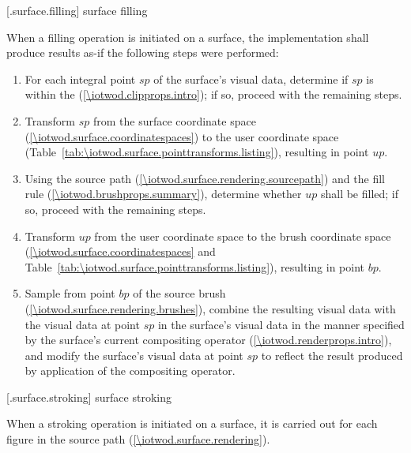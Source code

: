  [\iotwod.surface.filling] {surface filling}

\pnum
When a filling operation is initiated on a surface, the implementation shall produce results as-if the following steps were performed:

\begin{enumerate}
\item For each integral point $sp$ of the surface's visual data, determine if $sp$ is within the  (\ref{\iotwod.clipprops.intro}); if so, proceed with the remaining steps.
\item Transform $sp$ from the surface coordinate space (\ref{\iotwod.surface.coordinatespaces}) to the user coordinate space (Table~\ref{tab:\iotwod.surface.pointtransforms.listing}), resulting in point $up$.
\item Using the source path (\ref{\iotwod.surface.rendering.sourcepath}) and the fill rule (\ref{\iotwod.brushprops.summary}), determine whether $up$ shall be filled; if so, proceed with the remaining steps.
\item Transform $up$ from the user coordinate space to the brush coordinate space (\ref{\iotwod.surface.coordinatespaces} and Table~\ref{tab:\iotwod.surface.pointtransforms.listing}), resulting in point $bp$.
\item Sample from point $bp$ of the source brush (\ref{\iotwod.surface.rendering.brushes}), combine the resulting visual data with the visual data at point $sp$ in the surface's visual data in the manner specified by the surface's current compositing operator (\ref{\iotwod.renderprops.intro}), and modify the surface's visual data at point $sp$ to reflect the result produced by application of the compositing operator.
\end{enumerate}

 [\iotwod.surface.stroking] {surface stroking}

\pnum
When a stroking operation is initiated on a surface, it is carried out for each figure in the source path (\ref{\iotwod.surface.rendering}).


